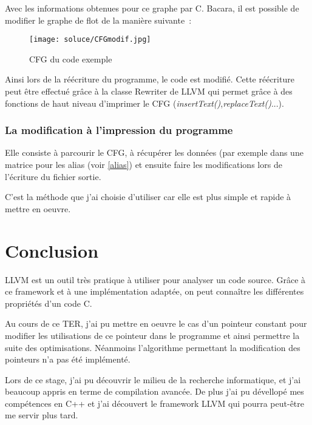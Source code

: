 \documentclass[11pt]{article}
\begin{document}
          Avec les informations obtenues pour ce graphe par C. Bacara,
          il est possible de modifier le graphe de flot de la manière
          suivante~:
	  \begin{figure}[H]
	    \centering
	    \texttt{[image: soluce/CFGmodif.jpg]} 
	    \caption{CFG du code exemple}
	    \label{fig:monlabl}
	  \end{figure}
	  
	  
	  Ainsi lors de la réécriture du programme, le code est modifié.
          Cette réécriture peut être effectué grâce à la classe Rewriter de LLVM qui permet grâce à des fonctions de haut niveau d'imprimer le CFG
          (\textit{insertText()},\textit{replaceText()}...).


      \subsubsection{La modification à l'impression du programme} 

	Elle consiste à parcourir le CFG, à récupérer les données (par
        exemple dans une matrice pour les alias (voir \ref{alias}) et ensuite faire les
        modifications lors de l'écriture du fichier sortie.

	C'est la méthode que j'ai choisie d'utiliser car elle est plus
        simple et rapide à mettre en oeuvre.
    


\section{Conclusion}

  LLVM est un outil très pratique à utiliser pour analyser un code source. 
  Grâce à ce framework et à une implémentation adaptée, on peut connaître les différentes propriétés d'un code C.
  
  Au cours de ce TER, j'ai pu mettre en oeuvre le cas d'un pointeur
  constant pour modifier les utilisations de ce pointeur dans le
  programme et ainsi permettre la suite des optimisations.
  Néanmoins l'algorithme permettant la modification des pointeurs n'a pas été implémenté.

  Lors de ce stage, j'ai pu découvrir le milieu de la recherche informatique, et j'ai beaucoup appris
  en terme de compilation avancée. De plus j'ai pu dévellopé mes compétences en C++ et j'ai découvert le framework LLVM
  qui pourra peut-être me servir plus tard.
\end{document}
